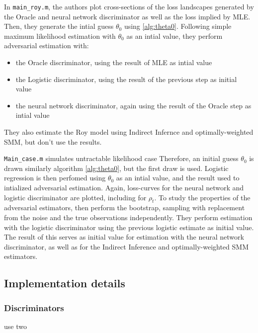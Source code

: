 In \texttt{main\_roy.m}, the authors plot cross-sections of the loss landscapes generated by the Oracle and neural network discriminator as well as the loss implied by MLE. %
Then, they generate the intial guess $\theta_0$ using \ref{alg:theta0}.
Following simple maximum likelihood estimation with $\theta_0$ as an intial value, they perform adversarial estimation with:
\begin{itemize}
    \item the Oracle discriminator, using the result of MLE as intial value
    \item the Logistic discriminator, using the result of the previous step as initial value
    \item the neural network discriminator, again using the result of the Oracle step as intial value
\end{itemize} 
They also estimate the Roy model using Indirect Infernce and optimally-weighted SMM, but don't use the results.

\texttt{Main\_case.m} simulates untractable likelihood case
Therefore, an initial guess $\theta_0$ is drawn similarly algorithm \ref{alg:theta0}, but the first draw is used.
Logistic regression is then perfomed using $\theta_0$ as an intial value, and the result used to intialized adversarial estimation. %
Again, loss-curves for the neural network and logistic discriminator are plotted, including for $\rho_t$.
To study the properties of the adversarial estimators, \textcite{kaji2023adversarial} then perform the bootstrap, sampling with replacement from the noise and the true observations independently.
They perform estimation with the logistic discriminator using the previous logistic estimate as initial value.
The result of this serves as initial value for estimation with the neural network discriminator, as well as for the Indirect Inference and optimally-weighted SMM estimators.



\subsection{Implementation details}
\label{sec:Implementation}

\subsubsection{Discriminators}

\textcite{kaji2023adversarial} use two 

